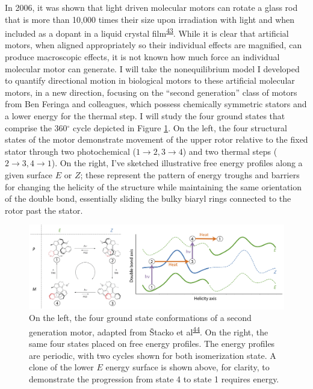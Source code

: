 \documentclass[11pt,notitlepage]{article}
\begin{document}
In 2006, it was shown that light driven molecular motors can rotate a
glass rod that is more than 10,000 times their size upon irradiation
with light and when included as a dopant in a liquid crystal
film\textsuperscript{\protect\hyperlink{ref-thFGBz32}{43}}. While it is
clear that artificial motors, when aligned appropriately so their
individual effects are magnified, can produce macroscopic effects, it is
not known how much force an individual molecular motor can generate. I
will take the nonequilibrium model I developed to quantify directional
motion in biological motors to these artificial molecular motors, in a
new direction, focusing on the ``second generation'' class of motors
from Ben Feringa and colleagues, which possess chemically symmetric
stators and a lower energy for the thermal step. I will study the four
ground states that comprise the 360\(^\circ\) cycle depicted in Figure
\ref{fig:motors}. On the left, the four structural states of the motor
demonstrate movement of the upper rotor relative to the fixed stator
through two photochemical (\(1 \rightarrow 2, 3 \rightarrow 4\)) and two
thermal steps (\(2 \rightarrow 3, 4 \rightarrow 1\)). On the right, I've
sketched illustrative free energy profiles along a given surface \(E\)
or \(Z\); these represent the pattern of energy troughs and barriers for
changing the helicity of the structure while maintaining the same
orientation of the double bond, essentially sliding the bulky biaryl
rings connected to the rotor past the stator.

\begin{figure}
\centering
\includegraphics[width=1\textwidth,height=\textheight]{content/images/offset-barriers.png}
\caption{On the left, the four ground state conformations of a second
generation motor, adapted from Štacko et
al\textsuperscript{\protect\hyperlink{ref-mKSNFvW7}{44}}. On the right,
the same four states placed on free energy profiles. The energy profiles
are periodic, with two cycles shown for both isomerization state. A
clone of the lower \(E\) energy surface is shown above, for clarity, to
demonstrate the progression from state 4 to state 1 requires
energy.\label{fig:motors}}
\end{figure}
\end{document}
